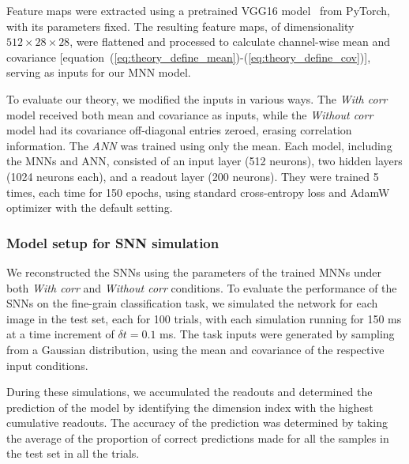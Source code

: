 Feature maps were extracted using a pretrained VGG16 model~\cite{simonyan2014very}  from PyTorch, with its parameters fixed. The resulting feature maps, of dimensionality \(512 \times 28 \times 28\), were flattened and processed to calculate channel-wise mean and covariance [equation~(\ref{eq:theory_define_mean})-(\ref{eq:theory_define_cov})], serving as inputs for our MNN model.

To evaluate our theory, we modified the inputs in various ways. 
The \textit{With corr} model received both mean and covariance as inputs, while the \textit{Without corr} model had its covariance off-diagonal entries zeroed, erasing correlation information. 
The \textit{ANN} was trained using only the mean. Each model, including the MNNs and ANN, consisted of an input layer (512 neurons), two hidden layers (1024 neurons each), and a readout layer (200 neurons). 
They were trained 5 times, each time for 150 epochs, using standard cross-entropy loss and AdamW optimizer with the default setting.

\subsubsection{Model setup for SNN simulation}
We reconstructed the SNNs using the parameters of the trained MNNs under both \textit{With corr} and \textit{Without corr} conditions. 
To evaluate the performance of the SNNs on the fine-grain classification task, we simulated the network for each image in the test set, each for 100 trials, with each simulation running for 150 ms at a time increment of \(\delta t = 0.1\) ms. 
The task inputs were generated by sampling from a Gaussian distribution, using the mean and covariance of the respective input conditions. 

During these simulations, we accumulated the readouts and determined the prediction of the model by identifying the dimension index with the highest cumulative readouts. 
The accuracy of the prediction was determined by taking the average of the proportion of correct predictions made for all the samples in the test set in all the trials.